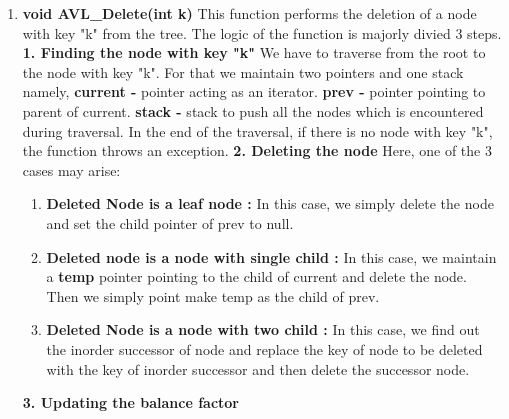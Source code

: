 \documentclass[12pt]{article}
\begin{document}
\begin{enumerate}
\begin{enumerate} [label=\roman*]
\begin{enumerate} [label=\roman*]
		        If a = -1, then insertion is done on the right of rebalancingPoint and left of temp. So, now RL rotation is performed.
            \end{enumerate}
        \end{enumerate}
    Time Complexity : O(h), where h = height of the tree.
    \item \textbf{void AVL\_Delete(int k)} \newline
    This function performs the deletion of a node with key "k" from the tree. The logic of the function is majorly divied 3 steps. \newline \newline
    \textbf{1. Finding the node with key "k"}\newline
    We have to traverse from the root to the node with key "k". For that we maintain two pointers and one stack namely, \newline
    \textbf{current - } pointer acting as an iterator.\newline
    \textbf{prev - } pointer pointing to parent of current.\newline
    \textbf{stack - } stack to push all the nodes which is encountered during traversal. \newline
    In the end of the traversal, if there is no node with key "k", the function throws an exception.\newline \newline
    \textbf{2. Deleting the node}\newline
    Here, one of the 3 cases may arise:
    \begin{enumerate}[label=\roman*]
        \item \textbf{Deleted Node is a leaf node :} In this case, we simply delete the node and set the child pointer of prev to null.
        \item \textbf{Deleted node is a node with single child : } In this case, we maintain a \textbf{temp} pointer pointing to the child of current and delete the node. Then we simply point make temp as the child of prev.
        \item \textbf{Deleted Node is a node with two child : }\newline
        In this case, we find out the inorder successor of node and replace the key of node to be deleted with the key of inorder successor and then delete the successor node. 
    \end{enumerate}
    \textbf{3. Updating the balance factor}\newline

\end{enumerate}
\end{document}
